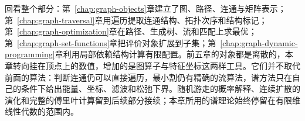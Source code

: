回看整个部分：第~\ref{chap:graph-objects}章建立了图、路径、连通与矩阵表示；第~\ref{chap:graph-traversal}章用遍历提取连通结构、拓扑次序和结构标记；第~\ref{chap:graph-optimization}章在路径、生成树、流和匹配上求最优；第~\ref{chap:graph-set-functions}章把评价对象扩展到子集；第~\ref{chap:graph-dynamic-programming}章利用局部依赖结构计算有限配置。前五章的对象都是离散的，本章转向挂在顶点上的数值，增加的是图算子与特征坐标这两样工具。它们并不取代前面的算法：判断连通仍可以直接遍历，最小割仍有精确的流算法，谱方法只在自己的条件下给出能量、坐标、滤波和松弛下界。随机游走的概率解释、连续扩散的演化和完整的傅里叶计算留到后续部分接续；本章所用的谱理论始终停留在有限维线性代数的范围内。
